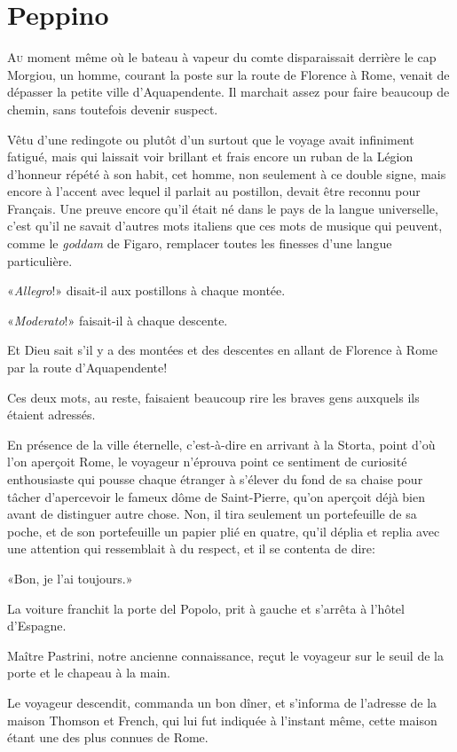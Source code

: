 \chapter{Peppino}

\lettrine{A}{u} moment même où le bateau à vapeur du comte disparaissait derrière le cap Morgiou, un homme, courant la poste sur la route de Florence à Rome, venait de dépasser la petite ville d'Aquapendente. Il marchait assez pour faire beaucoup de chemin, sans toutefois devenir suspect. 

Vêtu d'une redingote ou plutôt d'un surtout que le voyage avait infiniment fatigué, mais qui laissait voir brillant et frais encore un ruban de la Légion d'honneur répété à son habit, cet homme, non seulement à ce double signe, mais encore à l'accent avec lequel il parlait au postillon, devait être reconnu pour Français. Une preuve encore qu'il était né dans le pays de la langue universelle, c'est qu'il ne savait d'autres mots italiens que ces mots de musique qui peuvent, comme le \textit{goddam} de Figaro, remplacer toutes les finesses d'une langue particulière. 

«\textit{Allegro}!» disait-il aux postillons à chaque montée. 

«\textit{Moderato}!» faisait-il à chaque descente. 

Et Dieu sait s'il y a des montées et des descentes en allant de Florence à Rome par la route d'Aquapendente! 

Ces deux mots, au reste, faisaient beaucoup rire les braves gens auxquels ils étaient adressés. 

En présence de la ville éternelle, c'est-à-dire en arrivant à la Storta, point d'où l'on aperçoit Rome, le voyageur n'éprouva point ce sentiment de curiosité enthousiaste qui pousse chaque étranger à s'élever du fond de sa chaise pour tâcher d'apercevoir le fameux dôme de Saint-Pierre, qu'on aperçoit déjà bien avant de distinguer autre chose. Non, il tira seulement un portefeuille de sa poche, et de son portefeuille un papier plié en quatre, qu'il déplia et replia avec une attention qui ressemblait à du respect, et il se contenta de dire: 

«Bon, je l'ai toujours.» 

La voiture franchit la porte del Popolo, prit à gauche et s'arrêta à l'hôtel d'Espagne. 

Maître Pastrini, notre ancienne connaissance, reçut le voyageur sur le seuil de la porte et le chapeau à la main. 

Le voyageur descendit, commanda un bon dîner, et s'informa de l'adresse de la maison Thomson et French, qui lui fut indiquée à l'instant même, cette maison étant une des plus connues de Rome. 

